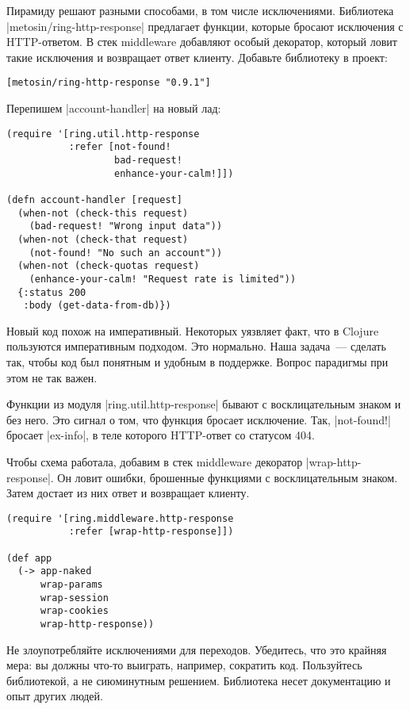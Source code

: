 Пирамиду решают разными способами, в том числе исключениями. Библиотека
\spverb|metosin/ring-http-response| предлагает функции, которые бросают
исключения с HTTP-ответом. В стек middleware добавляют особый декоратор, который
ловит такие исключения и возвращает ответ клиенту. Добавьте библиотеку в проект:

\begin{verbatim}
[metosin/ring-http-response "0.9.1"]
\end{verbatim}

Перепишем \spverb|account-handler| на новый лад:

\begin{verbatim}
(require '[ring.util.http-response
           :refer [not-found!
                   bad-request!
                   enhance-your-calm!]])

(defn account-handler [request]
  (when-not (check-this request)
    (bad-request! "Wrong input data"))
  (when-not (check-that request)
    (not-found! "No such an account"))
  (when-not (check-quotas request)
    (enhance-your-calm! "Request rate is limited"))
  {:status 200
   :body (get-data-from-db)})
\end{verbatim}

Новый код похож на императивный. Некоторых уязвляет факт, что в Clojure
пользуются императивным подходом. Это нормально. Наша задача~--- сделать так,
чтобы код был понятным и удобным в поддержке. Вопрос парадигмы при этом не так
важен.

Функции из модуля \spverb|ring.util.http-response| бывают с восклицательным
знаком и без него. Это сигнал о том, что функция бросает исключение. Так,
\spverb|not-found!| бросает \spverb|ex-info|, в теле которого HTTP-ответ со
статусом 404.

Чтобы схема работала, добавим в стек middleware декоратор
\spverb|wrap-http-response|. Он ловит ошибки, брошенные функциями с
восклицательным знаком. Затем достает из них ответ и возвращает клиенту.

\begin{verbatim}
(require '[ring.middleware.http-response
           :refer [wrap-http-response]])

(def app
  (-> app-naked
      wrap-params
      wrap-session
      wrap-cookies
      wrap-http-response))
\end{verbatim}

Не злоупотребляйте исключениями для переходов. Убедитесь, что это крайняя мера:
вы должны что-то выиграть, например, сократить код. Пользуйтесь библиотекой, а
не сиюминутным решением. Библиотека несет документацию и опыт других людей.

